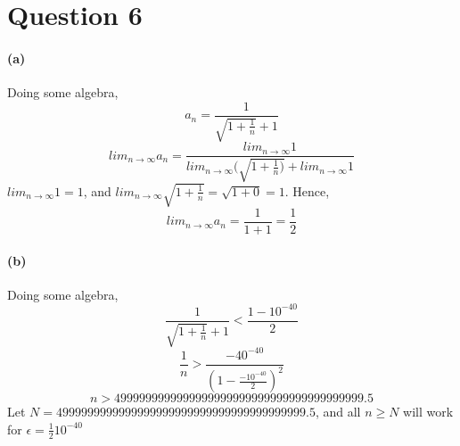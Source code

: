 \documentclass[10pt,letter]{article}
\begin{document}
\section*{Question 6}

\paragraph{(a)} 
Doing some algebra, 
$$a_n = \frac{1}{\sqrt{1 + \frac{1}{n}}+1}$$
$$lim_{n\rightarrow\infty}a_n = \frac{lim_{n\rightarrow\infty}1}{lim_{n\rightarrow\infty}(\sqrt{1 + \frac{1}{n})} + lim_{n\rightarrow\infty}1}$$
$lim_{n\rightarrow\infty}1 = 1$, and $lim_{n\rightarrow\infty}\sqrt{1 + \frac{1}{n}} = \sqrt{1+0} = 1$. Hence, $$lim_{n\rightarrow\infty}a_n = \frac{1}{1+1} = \frac{1}{2}$$

\paragraph{(b)} 
Doing some algebra,
$$\frac{1}{\sqrt{1+\frac{1}{n}}+1} < \frac{1-10^{-40}}{2}$$
$$\frac{1}{n} > \frac{-40^{-40}}{(1-\frac{-10^{-40}}{2})^2}$$
$$n > 4999999999999999999999999999999999999999.5$$
Let $N = 4999999999999999999999999999999999999999.5$, and all $n \geq N$ will work for $\epsilon = \frac{1}{2}10^{-40}$
\end{document}
